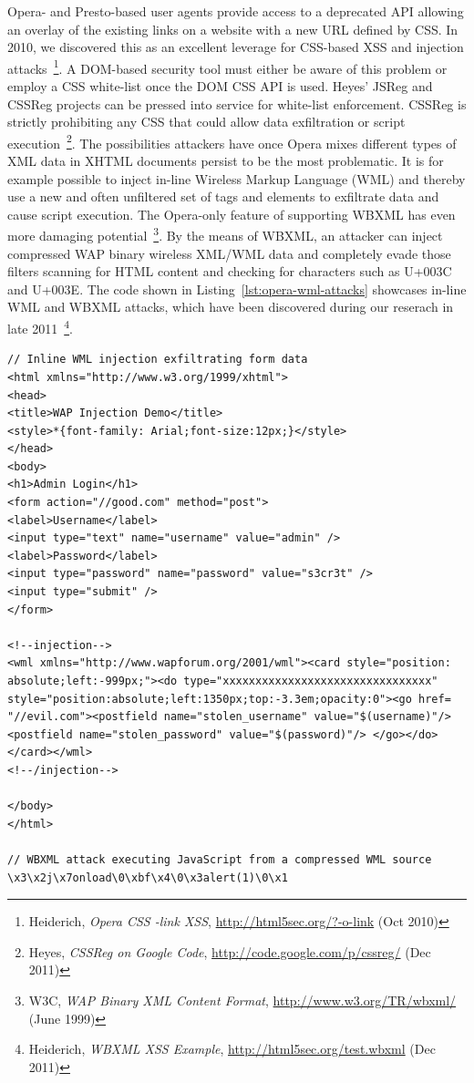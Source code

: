     Opera- and Presto-based user agents provide access to a deprecated API allowing an overlay of the existing links on a website with a new URL defined by CSS. In 2010, we discovered this as an excellent leverage for CSS-based XSS and injection attacks~\footnote{Heiderich, \textit{Opera CSS -link XSS}, \url{http://html5sec.org/?-o-link} (Oct 2010)}. A DOM-based security tool must either be aware of this problem or employ a CSS white-list once the DOM CSS API is used. Heyes' JSReg and CSSReg projects can be pressed into service for white-list enforcement. CSSReg is strictly prohibiting any CSS that could allow data exfiltration or script execution~\footnote{Heyes, \textit{CSSReg on Google Code}, \url{http://code.google.com/p/cssreg/} (Dec 2011)}. The possibilities attackers have once Opera mixes different types of XML data in XHTML documents persist to be the most problematic. It is for example possible to inject in-line Wireless Markup Language (WML) and thereby use a new and often unfiltered set of tags and elements to exfiltrate data and cause script execution. The Opera-only feature of supporting WBXML has even more damaging potential~\footnote{W3C, \textit{WAP Binary XML Content Format}, \url{http://www.w3.org/TR/wbxml/} (June 1999)}. By the means of WBXML, an attacker can inject compressed WAP binary wireless XML/WML data and completely evade those filters scanning for HTML content and checking for characters such as U+003C and U+003E. The code shown in Listing~\ref{lst:opera-wml-attacks} showcases in-line WML and WBXML attacks, which have been discovered during our reserach in late 2011~\footnote{Heiderich, \textit{WBXML XSS Example}, \url{http://html5sec.org/test.wbxml} (Dec 2011)}.

\begin{lstlisting}[captionpos=b,label=lst:opera-wml-attacks,caption=Example attacks using WML and WBXML in Opera; The first attack utilizes injected WML to overlap an existing form and accessing form element values; The second attack executes JavaScript via dictionary-compressed WBXML]
// Inline WML injection exfiltrating form data
<html xmlns="http://www.w3.org/1999/xhtml">
<head>
<title>WAP Injection Demo</title>
<style>*{font-family: Arial;font-size:12px;}</style>
</head>	
<body>
<h1>Admin Login</h1>
<form action="//good.com" method="post">
<label>Username</label>
<input type="text" name="username" value="admin" />
<label>Password</label>
<input type="password" name="password" value="s3cr3t" />
<input type="submit" />
</form>

<!--injection-->	
<wml xmlns="http://www.wapforum.org/2001/wml"><card style="position:
absolute;left:-999px;"><do type="xxxxxxxxxxxxxxxxxxxxxxxxxxxxxxxx" 
style="position:absolute;left:1350px;top:-3.3em;opacity:0"><go href=
"//evil.com"><postfield name="stolen_username" value="$(username)"/>
<postfield name="stolen_password" value="$(password)"/>	</go></do>
</card></wml>
<!--/injection-->	

</body>
</html>

// WBXML attack executing JavaScript from a compressed WML source
\x3\x2j\x7onload\0\xbf\x4\0\x3alert(1)\0\x1

\end{lstlisting}


